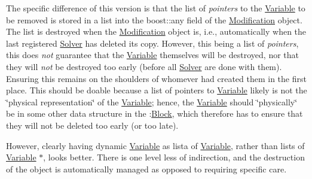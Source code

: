 The specific difference of this version is that the list of {\itshape pointers} to the \mbox{\hyperlink{class_s_m_spp__di__unipi__it_1_1_variable}{Variable}} to be removed is stored in a list into the boost\+::any field of the \mbox{\hyperlink{class_s_m_spp__di__unipi__it_1_1_modification}{Modification}} object. The list is destroyed when the \mbox{\hyperlink{class_s_m_spp__di__unipi__it_1_1_modification}{Modification}} object is, i.\+e., automatically when the last registered \mbox{\hyperlink{class_s_m_spp__di__unipi__it_1_1_solver}{Solver}} has deleted its copy. However, this being a list of {\itshape pointers}, this does {\itshape not} guarantee that the \mbox{\hyperlink{class_s_m_spp__di__unipi__it_1_1_variable}{Variable}} themselves will be destroyed, nor that they will {\itshape not} be destroyed too early (before all \mbox{\hyperlink{class_s_m_spp__di__unipi__it_1_1_solver}{Solver}} are done with them). Ensuring this remains on the shoulders of whomever had created them in the first place. This should be doable because a list of pointers to \mbox{\hyperlink{class_s_m_spp__di__unipi__it_1_1_variable}{Variable}} likely is not the \char`\"{}physical representation\char`\"{} of the \mbox{\hyperlink{class_s_m_spp__di__unipi__it_1_1_variable}{Variable}}; hence, the \mbox{\hyperlink{class_s_m_spp__di__unipi__it_1_1_variable}{Variable}} should \char`\"{}physically\char`\"{} be in some other data structure in the \+:\mbox{\hyperlink{class_s_m_spp__di__unipi__it_1_1_block}{Block}}, which therefore has to ensure that they will not be deleted too early (or too late).

However, clearly having dynamic \mbox{\hyperlink{class_s_m_spp__di__unipi__it_1_1_variable}{Variable}} as lista of \mbox{\hyperlink{class_s_m_spp__di__unipi__it_1_1_variable}{Variable}}, rather than lists of \mbox{\hyperlink{class_s_m_spp__di__unipi__it_1_1_variable}{Variable}} $\ast$, looks better. There is one level less of indirection, and the destruction of the object is automatically managed as opposed to requiring specific care. \mbox{\label{class_s_m_spp__di__unipi__it_1_1_block_a164c030eea2f1b177de50db119a63a32}} 
